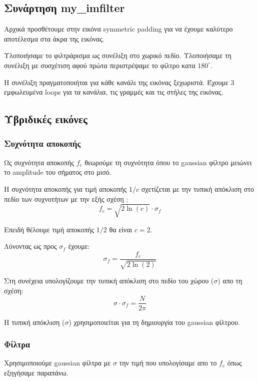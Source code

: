 \documentclass[11pt]{scrartcl} %
\begin{document}
\subsection{Συνάρτηση my\_imfilter}

Αρχικά προσθέτουμε στην εικόνα symmetric padding για να έχουμε καλύτερο αποτέλεσμα στα άκρα της εικόνας.

Υλοποιήσαμε το φιλτράρισμα ως συνέλιξη στο χωρικό πεδίο. Υλοποιήσαμε τη συνέλιξη με συσχέτιση αφού πρώτα περιστρέψαμε το φίλτρο κατα $180^{\circ}$.

Η συνέλιξη πραγματοποιήται για κάθε κανάλι της εικόνας ξεχωριστά. Έχουμε 3 εμφωλευμένα loops για τα κανάλια, τις γραμμές και τις στήλες της εικόνας.


\subsection{Υβριδικές εικόνες}

\subsubsection{Συχνότητα αποκοπής}

Ως συχνότητα αποκοπής $f_c$ θεωρούμε τη συχνότητα όπου το gaussian φίλτρο μειώνει το amplitude του σήματος στο μισό.

Η συχνότητα αποκοπής για τιμή αποκοπής $1/c$ σχετίζεται με την τυπική απόκλιση στο πεδίο των συχνοτήτων με την εξής σχέση \cite{wikipedia_gaussian_filter}:
\[f_c = \sqrt{2\ln(c)}\cdot\sigma_f\]

Επειδή θέλουμε τιμή αποκοπής $1/2$ θα είναι $c = 2$.

Λύνοντας ως προς $\sigma_f$ έχουμε:
\[\sigma_f = \frac{f_c}{\sqrt{2\ln(2)}}\]

Στη συνέχεια υπολογίζουμε την τυπική απόκλιση στο πεδίο του χώρου ($\sigma$) απο τη σχέση:
\[\sigma\cdot\sigma_f=\frac{N}{2\pi}\]

Η τυπική απόκλιση ($\sigma$) χρησιμοποιείται για τη δημιουργία του gaussian φίλτρου.

\subsubsection{Φίλτρα}

Χρησιμοποιούμε gaussian φίλτρα με $\sigma$ την τιμή που υπολογίσαμε απο το $f_c$ όπως εξηγήσαμε παραπάνω.
\end{document}
